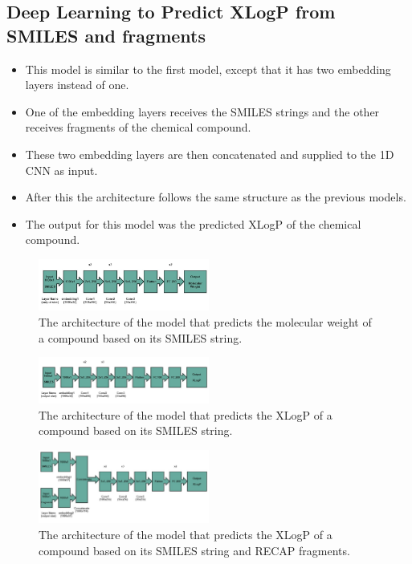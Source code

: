     \subsection{Deep Learning to Predict XLogP from SMILES and fragments}
        \begin{itemize}
            \item This model is similar to the first model, except that it has two embedding layers instead of one. 
            \item One of the embedding layers receives the SMILES strings and the other receives fragments of the chemical compound.
            \item These two embedding layers are then concatenated and supplied to the 1D CNN as input.
            \item After this the architecture follows the same structure as the previous models.
            \item The output for this model was the predicted XLogP of the chemical compound.
        \end{itemize}
    
    \begin{figure}
        \centering
        \includegraphics[width=0.5\textwidth]{figures/MW-model_arquitecture.jpg}
        \caption{The architecture of the model that predicts the molecular weight of a compound based on its SMILES string.}
        \label{fig:mw-architecture}
    \end{figure}
    \begin{figure}
        \centering
        \includegraphics[width=0.5\textwidth]{figures/XLogP-model_arquitecture.jpg}
        \caption{The architecture of the model that predicts the XLogP of a compound based on its SMILES string.}
        \label{fig:xlogp-archi1}
    \end{figure}
    \begin{figure}
        \centering
        \includegraphics[width=0.5\textwidth]{figures/XLogP_frag_model_arquitecture.jpg}
        \caption{The architecture of the model that predicts the XLogP of a compound based on its SMILES string and RECAP fragments.}
        \label{fig:model23-mol-weight-loss}
    \end{figure}